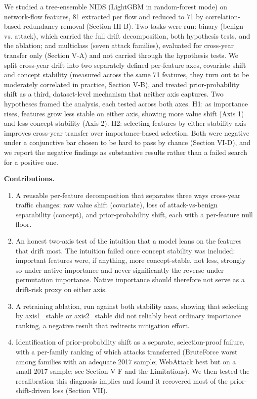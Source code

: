 \documentclass[conference]{IEEEtran}
\begin{document}
We studied a tree-ensemble NIDS (LightGBM in random-forest mode) on network-flow features, 81 extracted per flow and reduced to 71 by correlation-based redundancy removal (Section III-B). Two tasks were run: binary (benign vs. attack), which carried the full drift decomposition, both hypothesis tests, and the ablation; and multiclass (seven attack families), evaluated for cross-year transfer only (Section V-A) and not carried through the hypothesis tests. We split cross-year drift into two separately defined per-feature axes, covariate shift and concept stability (measured across the same 71 features, they turn out to be moderately correlated in practice, Section V-B), and treated prior-probability shift as a third, dataset-level mechanism that neither axis captures. Two hypotheses framed the analysis, each tested across both axes. H1: as importance rises, features grow less stable on either axis, showing more value shift (Axis 1) and less concept stability (Axis 2). H2: selecting features by either stability axis improves cross-year transfer over importance-based selection. Both were negative under a conjunctive bar chosen to be hard to pass by chance (Section VI-D), and we report the negative findings as substantive results rather than a failed search for a positive one.
\par\medskip

\noindent\textbf{Contributions.}\par\smallskip

\begin{enumerate}[leftmargin=*,itemsep=2pt,topsep=2pt]
  \item A reusable per-feature decomposition that separates three ways cross-year traffic changes: raw value shift (covariate), loss of attack-vs-benign separability (concept), and prior-probability shift, each with a per-feature null floor.
  \item An honest two-axis test of the intuition that a model leans on the features that drift most. The intuition failed once concept stability was included: important features were, if anything, more concept-stable, not less, strongly so under native importance and never significantly the reverse under permutation importance. Native importance should therefore not serve as a drift-risk proxy on either axis.
  \item A retraining ablation, run against both stability axes, showing that selecting by axis1\_\allowbreak{}stable or axis2\_\allowbreak{}stable did not reliably beat ordinary importance ranking, a negative result that redirects mitigation effort.
  \item Identification of prior-probability shift as a separate, selection-proof failure, with a per-family ranking of which attacks transferred (BruteForce worst among families with an adequate 2017 sample; WebAttack best but on a small 2017 sample; see Section V-F and the Limitations). We then tested the recalibration this diagnosis implies and found it recovered most of the prior-shift-driven loss (Section VII).
\end{enumerate}
\end{document}
